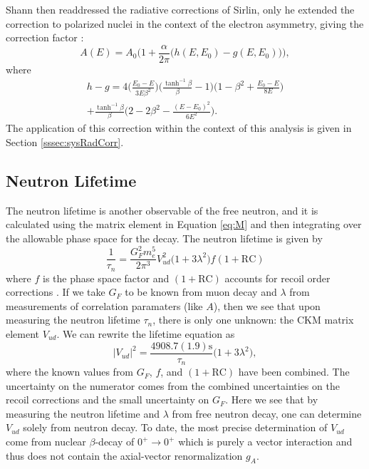 Shann then readdressed the radiative corrections of Sirlin, only he extended the
correction to polarized nuclei in the context of the electron asymmetry,
giving the correction factor \cite{shann1971}:
%
\begin{equation}
  A(E) = A_0\bigg(1+\frac{\alpha}{2\pi}\Big(h(E,E_0)-g(E,E_0)\Big)\bigg),
\end{equation}
where
\begin{multline}
  h-g = 4 \bigg( \frac{E_0-E}{3E\beta^2} \bigg)
  \bigg( \frac{\tanh^{-1}\beta}{\beta}-1 \bigg)
  \bigg(1-\beta^2+ \frac{E_0-E}{8E} \bigg) \\
  + \frac{\tanh^{-1}\beta}{\beta}
  \bigg( 2-2\beta^2-\frac{\left(E-E_0\right)^2}{6E^2} \bigg).
\end{multline}
%
The application of this correction within the context of this analysis is given in
Section \ref{sssec:sysRadCorr}.

\subsection{Neutron Lifetime}
The neutron lifetime is another observable of the free neutron, and it is calculated using the matrix
element in Equation \ref{eq:M} and then integrating over the allowable phase space for the decay.
The neutron lifetime is given by
%
\begin{equation}
  \frac{1}{\tau_n} = \frac{G_F^2 m_e^5}{2\pi^3}V_{ud}^2 \big(1+3\lambda^2)f(1+\mathrm{RC})
\end{equation}
%
where $f$ is the phase space factor and $(1+\mathrm{RC})$ accounts for recoil order
corrections \cite{czarnecki2004precision}. If we take $G_F$ to be known from muon decay and $\lambda$ from
measurements of correlation paramaters (like $A$), then we see that upon measuring the
neutron lifetime $\tau_n$, there is only one unknown: the CKM matrix element $V_{ud}$.
We can rewrite the lifetime equation as
%
\begin{equation}
  |V_{ud}|^2 = \frac{4908.7(1.9)\mathrm{s}}{\tau_n}\big(1+3\lambda^2\big),
\end{equation}
where the known values from $G_F$, $f$, and $(1+\mathrm{RC})$ have been combined.
The uncertainty on the numerator comes from the combined uncertainties on
the recoil corrections and the small uncertainty on $G_F$. Here we see that
by measuring the neutron lifetime and $\lambda$ from free neutron decay,
one can determine $V_{ud}$ solely from neutron decay. 
To date, the most precise determination of $V_{ud}$ come from nuclear
$\beta$-decay of $0^+ \rightarrow 0^+$ which is purely a vector interaction
and thus does not contain the axial-vector renormalization $g_A$.



